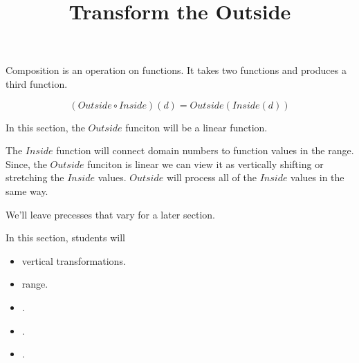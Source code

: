 \documentclass{ximera}
\title{Transform the Outside}
\begin{document}
\begin{abstract}
\end{abstract}
\maketitle









Composition is an operation on functions.  It takes two functions and produces a third function.


\[  (Outside \circ Inside)(d) = Outside(Inside(d))    \]


In this section, the $Outside$ funciton will be a linear function.

The $Inside$ function will connect domain numbers to function values in the range.  Since, the $Outside$ funciton is linear we can view it as vertically shifting or stretching the $Inside$ values.  $Outside$ will process all of the $Inside$ values in the same way.

We'll leave precesses that vary for a later section. 











\begin{sectionOutcomes}
In this section, students will 

\begin{itemize}
\item vertical transformations.
\item range.
\item .
\item .
\item .
\end{itemize}
\end{sectionOutcomes}
\end{document}
